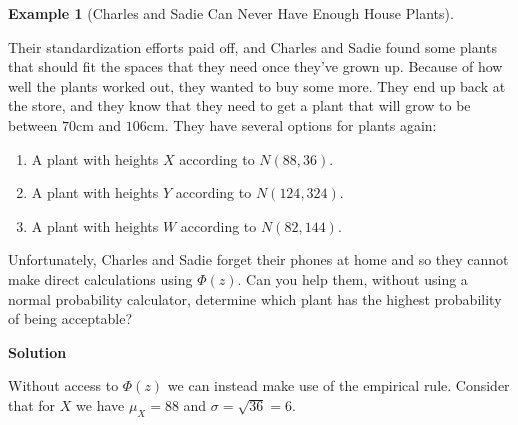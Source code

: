 \documentclass[
  letterpaper,
  DIV=11,
  numbers=noendperiod]{scrreprt}
\providecommand{\tightlist}{%
  \setlength{\itemsep}{0pt}\setlength{\parskip}{0pt}}\usepackage{longtable,booktabs,array}
\theoremstyle{definition}
\theoremstyle{definition}
\newtheorem{example}{Example}[chapter]
\theoremstyle{definition}
\theoremstyle{remark}
\begin{document}
\begin{example}[Charles and Sadie Can Never Have Enough House
Plants]\protect\hypertarget{exm-empirical-rule-calc}{}\label{exm-empirical-rule-calc}

Their standardization efforts paid off, and Charles and Sadie found some
plants that should fit the spaces that they need once they've grown up.
Because of how well the plants worked out, they wanted to buy some more.
They end up back at the store, and they know that they need to get a
plant that will grow to be between \(70\)cm and \(106\)cm. They have
several options for plants again:

\begin{enumerate}
\def\labelenumi{\roman{enumi}.}
\tightlist
\item
  A plant with heights \(X\) according to \(N(88, 36)\).
\item
  A plant with heights \(Y\) according to \(N(124, 324)\).
\item
  A plant with heights \(W\) according to \(N(82, 144)\).
\end{enumerate}

Unfortunately, Charles and Sadie forget their phones at home and so they
cannot make direct calculations using \(\Phi(z)\). Can you help them,
without using a normal probability calculator, determine which plant has
the highest probability of being acceptable?

\begin{tcolorbox}[enhanced jigsaw, colback=white, colframe=quarto-callout-color-frame, arc=.35mm, leftrule=.75mm, rightrule=.15mm, opacityback=0, breakable, bottomrule=.15mm, left=2mm, toprule=.15mm]

\vspace{-3mm}\textbf{Solution}\vspace{3mm}

Without access to \(\Phi(z)\) we can instead make use of the empirical
rule. Consider that for \(X\) we have \(\mu_X = 88\) and
\(\sigma = \sqrt{36} = 6\).


\end{tcolorbox}
\end{example}
\end{document}
